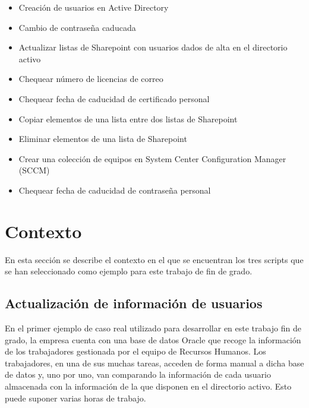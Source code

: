 \documentclass[a4paper, 12pt]{book}
\begin{document}
\begin{itemize}
\item Creación de usuarios en Active Directory

\item Cambio de contraseña caducada

\item Actualizar listas de Sharepoint con usuarios dados de alta en el directorio activo

\item Chequear número de licencias de correo

\item Chequear fecha de caducidad de certificado personal

\item Copiar elementos de una lista entre dos listas de Sharepoint

\item Eliminar elementos de una lista de Sharepoint

\item Crear una colección de equipos en System Center Configuration Manager (SCCM)

\item Chequear fecha de caducidad de contraseña personal
\end{itemize}


\section{Contexto}
\label{sec:contexto}

En esta sección se describe el contexto en el que se encuentran los tres scripts que se han seleccionado como ejemplo para este trabajo de fin de grado.

\subsection{Actualización de información de usuarios}
\label{subsec:Actualización de información de usuarios}

En el primer ejemplo de caso real utilizado para desarrollar en este trabajo fin de grado, la empresa cuenta con una base de datos Oracle que recoge la información de los trabajadores gestionada por el equipo de Recursos Humanos. Los trabajadores, en una de sus muchas tareas, acceden de forma manual a dicha base de datos y, uno por uno, van comparando la información de cada usuario almacenada con la información de la que disponen en el directorio activo. Esto puede suponer varias horas de trabajo.
\\
\end{document}
